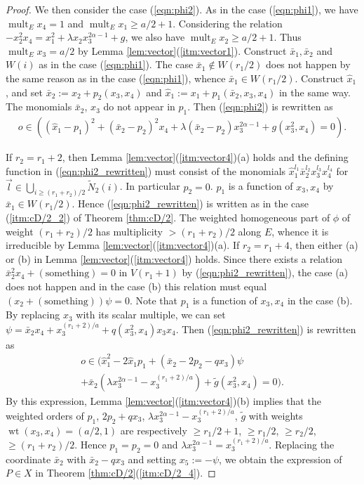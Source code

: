 \documentclass[a4paper,11pt]{amsart}
\theoremstyle{definition}
\theoremstyle{remark}
\numberwithin{equation}{section}
\newcommand{\mult}{\operatorname{mult}}
\newcommand{\something}{\mathrm{something}}
\newcommand{\wt}{\operatorname{wt}}
\begin{document}
\begin{proof}
We then consider the case (\ref{eqn:phi2}).
As in the case (\ref{eqn:phi1}),
we have $\mult_E x_4=1$ and $\mult_E x_1 \ge a/2+1$.
Considering the relation $-x_2^2x_4=x_1^2+\lambda x_2x_3^{2\alpha-1}+g$,
we also have $\mult_E x_2 \ge a/2+1$.
Thus $\mult_E x_3=a/2$ by Lemma \ref{lem:vector}(\ref{itm:vector1}).
Construct $\bar{x}_1, \bar{x}_2$ and $W(i)$ as in the case (\ref{eqn:phi1}).
The case $\bar{x}_1 \not\in W(r_1/2)$ does not happen
by the same reason as in the case (\ref{eqn:phi1}),
whence $\bar{x}_1 \in W(r_1/2)$.
Construct $\hat{x}_1$,
and set $\bar{x}_2:=x_2+p_2(x_3,x_4)$
and $\hat{x}_1:=x_1+p_1(\bar{x}_2,x_3,x_4)$ in the same way.
The monomials $\bar{x}_2$, $x_3$ do not appear in $p_1$.
Then (\ref{eqn:phi2}) is rewritten as
\begin{align}\label{eqn:phi2_rewritten}
o \in ((\hat{x}_1-p_1)^2+(\bar{x}_2-p_2)^2x_4+
\lambda(\bar{x}_2-p_2)x_3^{2\alpha-1}+g(x_3^2,x_4)=0).
\end{align}

If $r_2=r_1+2$,
then Lemma \ref{lem:vector}(\ref{itm:vector4})(a) holds
and the defining function in (\ref{eqn:phi2_rewritten}) must consist of
the monomials $\hat{x}_1^{l_1}\bar{x}_2^{l_2}x_3^{l_3}x_4^{l_4}$
for $\vec{l}\in \bigcup_{i\ge (r_1+r_2)/2}\tilde{N}_2(i)$.
In particular $p_2=0$.
$p_1$ is a function of $x_3,x_4$ by $\bar{x}_1 \in W(r_1/2)$.
Hence (\ref{eqn:phi2_rewritten}) is written
as in the case (\ref{itm:cD/2_2}) of Theorem \ref{thm:cD/2}.
The weighted homogeneous part of $\phi$ of weight $(r_1+r_2)/2$
has multiplicity $>(r_1+r_2)/2$ along $E$,
whence it is irreducible by Lemma \ref{lem:vector}(\ref{itm:vector4})(a).
If $r_2=r_1+4$,
then either (a) or (b) in Lemma \ref{lem:vector}(\ref{itm:vector4}) holds.
Since there exists a relation $\bar{x}_2^2x_4+(\something)=0$ in $V(r_1+1)$
by (\ref{eqn:phi2_rewritten}),
the case (a) does not happen
and in the case (b) this relation must equal $(x_2+(\something))\psi=0$.
Note that $p_1$ is a function of $x_3,x_4$ in the case (b).
By replacing $x_3$ with its scalar multiple,
we can set $\psi=\bar{x}_2x_4+x_3^{(r_1+2)/a}+q(x_3^2,x_4)x_3x_4$.
Then (\ref{eqn:phi2_rewritten}) is rewritten as
\begin{multline*}
o \in (\hat{x}_1^2-2\hat{x}_1p_1+(\bar{x}_2-2p_2-qx_3)\psi \\
+\bar{x}_2(\lambda x_3^{2\alpha-1}-x_3^{(r_1+2)/a})+\tilde{g}(x_3^2,x_4)=0).
\end{multline*}
By this expression,
Lemma \ref{lem:vector}(\ref{itm:vector4})(b) implies that
the weighted orders of
$p_1$, $2p_2+qx_3$, $\lambda x_3^{2\alpha-1}-x_3^{(r_1+2)/a}$, $\tilde{g}$
with weights $\wt(x_3,x_4)=(a/2,1)$
are respectively $\ge r_1/2+1$, $\ge r_1/2$, $\ge r_2/2$, $\ge (r_1+r_2)/2$.
Hence $p_1=p_2=0$ and $\lambda x_3^{2\alpha-1}=x_3^{(r_1+2)/a}$.
Replacing the coordinate $\bar{x}_2$ with $\bar{x}_2-qx_3$
and setting $x_5:=-\psi$,
we obtain the expression of $P \in X$
in Theorem \ref{thm:cD/2}(\ref{itm:cD/2_4}).
\end{proof}
\end{document}
